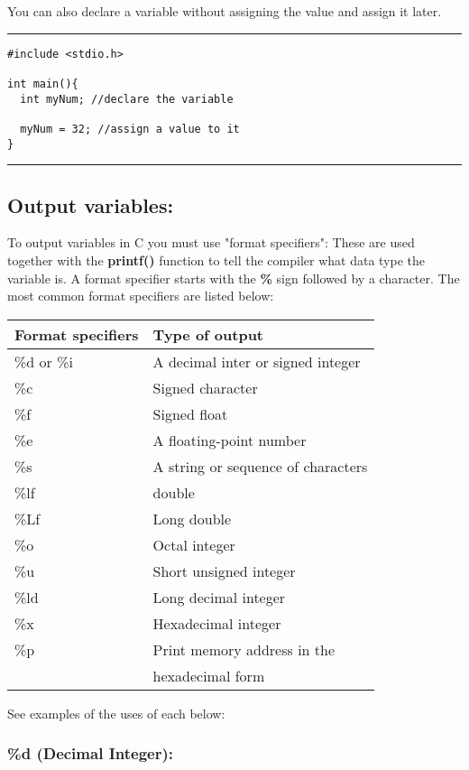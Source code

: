 \documentclass[a4paper]{article}
\begin{document}
You can also declare a variable without assigning the value and assign it
later.

\noindent\rule{\textwidth}{0.5pt}
\begin{verbatim}
#include <stdio.h>

int main(){
  int myNum; //declare the variable

  myNum = 32; //assign a value to it
}
\end{verbatim}

\noindent\rule{\textwidth}{0.5pt}

\subsection{Output variables:}
\label{sec:org02a8fd0}
To output variables in C you must use "format specifiers":
These are used together with the \textbf{printf()} function to tell the compiler what
data type the variable is.
A format specifier starts with the \textbf{\%} sign followed by a character.
The most common format specifiers are listed below:
\begin{center}
\begin{tabular}{l|l}
\hline
Format specifiers & Type of output\\
\hline
\%d or \%i & A decimal inter or signed integer\\
\hline
\%c & Signed character\\
\hline
\%f & Signed float\\
\hline
\%e & A floating-point number\\
\hline
\%s & A string or sequence of characters\\
\hline
\%lf & double\\
\hline
\%Lf & Long double\\
\hline
\%o & Octal integer\\
\hline
\%u & Short unsigned integer\\
\hline
\%ld & Long decimal integer\\
\hline
\%x & Hexadecimal integer\\
\hline
\%p & Print memory address in the\\
 & hexadecimal form\\
\hline
\end{tabular}
\end{center}

See examples of the uses of each below:

\subsubsection{\%d (Decimal Integer):}
\label{sec:org955a7c5}
\end{document}
